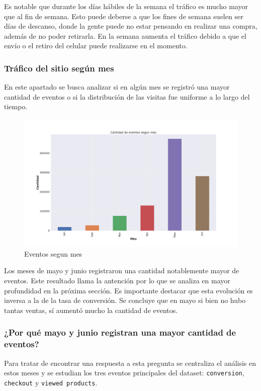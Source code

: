 \documentclass[a4paper]{article}
\begin{document}
Es notable que durante los días hábiles de la semana el tráfico es mucho mayor que al fin de semana. Esto puede deberse a que los fines de semana suelen ser días de descanso, donde la gente puede no estar pensando en realizar una compra, además de no poder retirarla. En la semana aumenta el tráfico debido a que el envío o el retiro del celular puede realizarse en el momento.

\subsubsection{Tráfico del sitio según mes}

En este apartado se busca analizar si en algún mes se registró una mayor cantidad de eventos o si la distribución de las visitas fue uniforme a lo largo del tiempo.

\begin{figure}[h!]
	\includegraphics[width=\linewidth]{figures/032-eventos_segun_mes-barplot.png}
	\caption{Eventos segun mes}
	\label{fig:mes}
\end{figure}

Los meses de mayo y junio registraron una cantidad notablemente mayor de eventos. Este resultado llama la antención por lo que se analiza en mayor profundidad en la próxima sección. Es importante destacar que esta evolución es inversa a la de la tasa de conversión. Se concluye que en mayo si bien no hubo tantas ventas, sí aumentó mucho la cantidad de eventos. 

\subsubsection{¿Por qué mayo y junio registran una mayor cantidad de eventos?}

Para tratar de encontrar una respuesta a esta pregunta se centraliza el análisis en estos meses y se estudian los tres eventos principales del dataset: \texttt{conversion}, \texttt{checkout} y \texttt{viewed products}.
\end{document}
